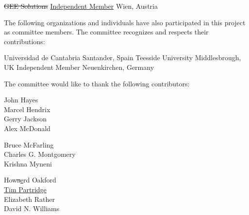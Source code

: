 \cbstart
{}				{ }	{\sout{GEE Solutions} \uline{Independent Member}}						{Wien, Austria}
\cbend

The following organizations and individuals have also participated in
this project as committee members. The committee recognizes and
respects their contributions:

	{}	{Universidad de Cantabria}	{Santander, Spain}
		{}		{Teesside University}		{Middlesbrough, UK}
		{}			{Independent Member}		{Neuenkirchen, Germany}

The committee would like to thank the following contributors:

\begin{minipage}[t]{.3\linewidth}
John		Hayes \\
Marcel		Hendrix \\
Gerry		Jackson \\
Alex		McDonald \\
\end{minipage}
\hfill
\begin{minipage}[t]{.3\linewidth}
Bruce		McFarling \\
Charles G.	Montgomery \\
Krishna		Myneni \\
\end{minipage}
\hfill
\begin{minipage}[t]{.3\linewidth}
How\cbstart\sout{a}\uline{e}\cbend rd		Oakford \\
\cbstart\uline{Tim Partridge}\cbend \\
Elizabeth	Rather \\
David N.	Williams \\
\end{minipage}